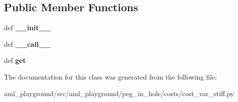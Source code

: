 \subsection*{Public Member Functions}
\begin{DoxyCompactItemize}
\item 
\hypertarget{classaml__playground_1_1peg__in__hole_1_1costs_1_1cost__var__stiff_1_1_var_stiffness_cost_a9e2ebf22f5d0352232d824084d805d56}{def {\bfseries \-\_\-\-\_\-init\-\_\-\-\_\-}}\label{classaml__playground_1_1peg__in__hole_1_1costs_1_1cost__var__stiff_1_1_var_stiffness_cost_a9e2ebf22f5d0352232d824084d805d56}

\item 
\hypertarget{classaml__playground_1_1peg__in__hole_1_1costs_1_1cost__var__stiff_1_1_var_stiffness_cost_a6ce131fcab0f6ae02a53d7f043437dba}{def {\bfseries \-\_\-\-\_\-call\-\_\-\-\_\-}}\label{classaml__playground_1_1peg__in__hole_1_1costs_1_1cost__var__stiff_1_1_var_stiffness_cost_a6ce131fcab0f6ae02a53d7f043437dba}

\item 
\hypertarget{classaml__playground_1_1peg__in__hole_1_1costs_1_1cost__var__stiff_1_1_var_stiffness_cost_aca689e95ce7ba7f9d08eb521f03a07da}{def {\bfseries get}}\label{classaml__playground_1_1peg__in__hole_1_1costs_1_1cost__var__stiff_1_1_var_stiffness_cost_aca689e95ce7ba7f9d08eb521f03a07da}

\end{DoxyCompactItemize}


The documentation for this class was generated from the following file\-:\begin{DoxyCompactItemize}
\item 
aml\-\_\-playground/src/aml\-\_\-playground/peg\-\_\-in\-\_\-hole/costs/cost\-\_\-var\-\_\-stiff.\-py\end{DoxyCompactItemize}
